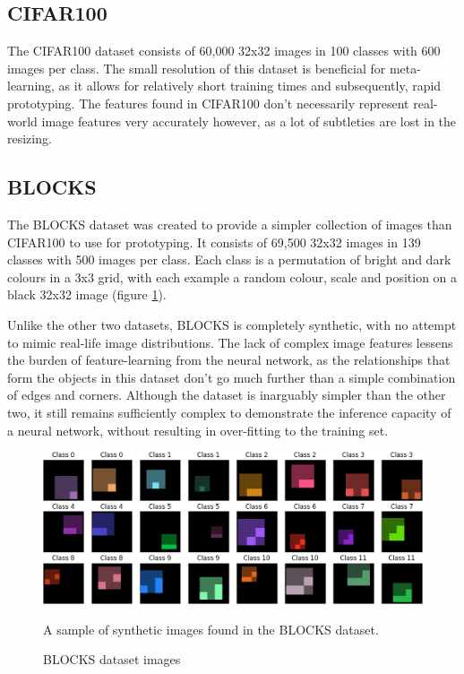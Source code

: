 \documentclass{report}
\begin{document}
\subsection{CIFAR100}
The CIFAR100\parencite{cifar100} dataset consists of 60,000 32x32 images in 100 classes with 600 images per class. The small resolution of this dataset is beneficial for meta-learning, as it allows for relatively short training times and subsequently, rapid prototyping. The features found in CIFAR100 don't necessarily represent real-world image features very accurately however, as a lot of subtleties are lost in the resizing.

\subsection{BLOCKS}
The BLOCKS dataset was created to provide a simpler collection of images than CIFAR100 to use for prototyping. It consists of 69,500 32x32 images in 139 classes with 500 images per class. Each class is a permutation of bright and dark colours in a 3x3 grid, with each example a random colour, scale and position on a black 32x32 image (figure \ref{fig:blocks:1}). \par
Unlike the other two datasets, BLOCKS is completely synthetic, with no attempt to mimic real-life image distributions. The lack of complex image features lessens the burden of feature-learning from the neural network, as the relationships that form the objects in this dataset don't go much further than a simple combination of edges and corners. Although the dataset is inarguably simpler than the other two, it still remains sufficiently complex to demonstrate the inference capacity of a neural network, without resulting in over-fitting to the training set.

\begin{figure}[h]
	\centering
	\includegraphics[width=15cm]{blocks}
	\caption{BLOCKS dataset images}
	A sample of synthetic images found in the BLOCKS dataset.
	\label{fig:blocks:1}
\end{figure}
\end{document}
